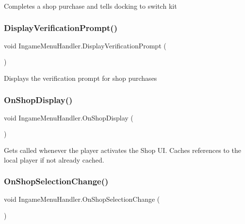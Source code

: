 Completes a shop purchase and tells docking to switch kit 

\hypertarget{class_ingame_menu_handler_ae7468318a2c601be76aed42256465706}{}\label{class_ingame_menu_handler_ae7468318a2c601be76aed42256465706} 
\subsubsection{\texorpdfstring{Display\+Verification\+Prompt()}{DisplayVerificationPrompt()}}
{\footnotesize\ttfamily void Ingame\+Menu\+Handler.\+Display\+Verification\+Prompt (\begin{DoxyParamCaption}{ }\end{DoxyParamCaption})}



Displays the verification prompt for shop purchases 

\hypertarget{class_ingame_menu_handler_ab5a914a3577e1864e87a51015dcdf8c0}{}\label{class_ingame_menu_handler_ab5a914a3577e1864e87a51015dcdf8c0} 
\subsubsection{\texorpdfstring{On\+Shop\+Display()}{OnShopDisplay()}}
{\footnotesize\ttfamily void Ingame\+Menu\+Handler.\+On\+Shop\+Display (\begin{DoxyParamCaption}{ }\end{DoxyParamCaption})}



Gets called whenever the player activates the Shop UI. Caches references to the local player if not already cached. 

\hypertarget{class_ingame_menu_handler_a2581d0e185a8fe9ca54d7add14b9db93}{}\label{class_ingame_menu_handler_a2581d0e185a8fe9ca54d7add14b9db93} 
\subsubsection{\texorpdfstring{On\+Shop\+Selection\+Change()}{OnShopSelectionChange()}}
{\footnotesize\ttfamily void Ingame\+Menu\+Handler.\+On\+Shop\+Selection\+Change (\begin{DoxyParamCaption}{ }\end{DoxyParamCaption})}



